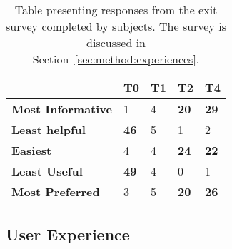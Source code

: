 \begin{table}[t]
    \caption{Table presenting responses from the exit survey completed by subjects. The survey is discussed in Section~\ref{sec:method:experiences}.\vspace{-3mm}}
    \label{tbl_exit}
    \renewcommand{\arraystretch}{1.4}
    \begin{center}
    \begin{tabulary}{\textwidth}{L{3.8cm}||D{0.7cm}|D{0.7cm}|D{0.7cm}|D{0.7cm}}
    \hline
	    & \textbf{T0} & \textbf{T1} & \textbf{T2} & \textbf{T4}  \\ \hline\hline
    \textbf{Most Informative} & 1 & 4 & \textbf{20} & \textbf{29} \\ \hline
    \textbf{Least helpful} & \textbf{46} & 5 & 1 & 2 \\ \hline
    \textbf{Easiest} & 4 & 4 & \textbf{24} & \textbf{22} \\ \hline
    \textbf{Least Useful} & \textbf{49} & 4 & 0 & 1 \\ \hline
    \textbf{Most Preferred} & 3 & 5 & \textbf{20} & \textbf{26} \\ \hline

    \end{tabulary}
    \end{center}
\end{table}

\subsection{User Experience}

